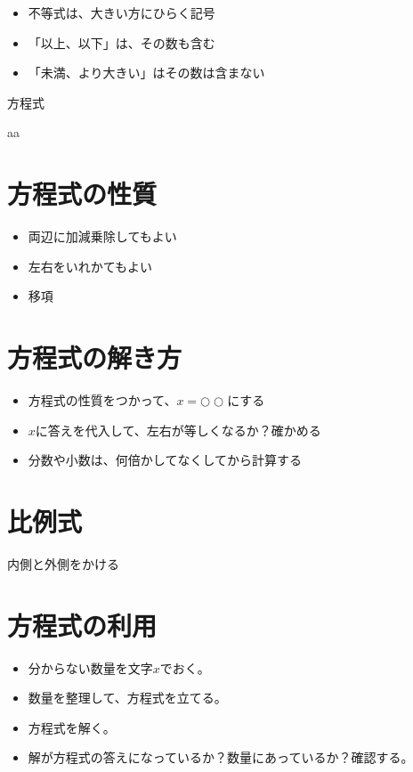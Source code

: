 \documentclass[11pt]{article}
\begin{document}
\begin{tcolorbox}[mybox={不等号に関する注意}]
\begin{itemize}
\item 不等式は、大きい方にひらく記号
\item 「以上、以下」は、その数も含む
\item 「未満、より大きい」はその数は含まない
\end{itemize}
\end{tcolorbox}

\newpage

{\LARGE \noindent 方程式}

\begin{tcolorbox}[mybox={方程式の性質}]
aa
\end{tcolorbox}

\section{方程式の性質}
\begin{itemize}
\item 両辺に加減乗除してもよい
\item 左右をいれかてもよい
\item 移項
\end{itemize}

\section{方程式の解き方}
\begin{itemize}
\item 方程式の性質をつかって、$x=○○$にする
\item $x$に答えを代入して、左右が等しくなるか？確かめる
\item 分数や小数は、何倍かしてなくしてから計算する
\end{itemize}

\section{比例式}
内側と外側をかける

\section{方程式の利用}
\begin{itemize}
\item 分からない数量を文字$x$でおく。
\item 数量を整理して、方程式を立てる。
\item 方程式を解く。
\item 解が方程式の答えになっているか？数量にあっているか？確認する。
\end{itemize}
\end{document}
